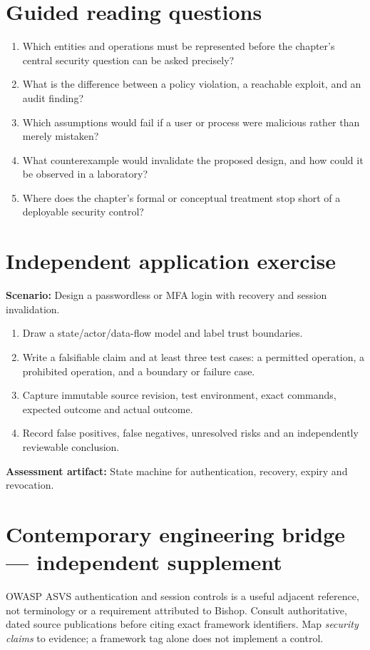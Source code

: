 \documentclass[10pt,letterpaper]{article}
\begin{document}
\section{Guided reading questions}
\begin{enumerate}
\item Which entities and operations must be represented before the chapter's central security question can be asked precisely?
\item What is the difference between a policy violation, a reachable exploit, and an audit finding?
\item Which assumptions would fail if a user or process were malicious rather than merely mistaken?
\item What counterexample would invalidate the proposed design, and how could it be observed in a laboratory?
\item Where does the chapter's formal or conceptual treatment stop short of a deployable security control?
\end{enumerate}
\section{Independent application exercise}
\textbf{Scenario:} Design a passwordless or MFA login with recovery and session invalidation.
\begin{enumerate}
\item Draw a state/actor/data-flow model and label trust boundaries.
\item Write a falsifiable claim and at least three test cases: a permitted operation, a prohibited operation, and a boundary or failure case.
\item Capture immutable source revision, test environment, exact commands, expected outcome and actual outcome.
\item Record false positives, false negatives, unresolved risks and an independently reviewable conclusion.
\end{enumerate}
\textbf{Assessment artifact:} State machine for authentication, recovery, expiry and revocation.
\section{Contemporary engineering bridge --- independent supplement}
OWASP ASVS authentication and session controls is a useful adjacent reference, not terminology or a requirement attributed to Bishop. Consult authoritative, dated source publications before citing exact framework identifiers. Map \emph{security claims} to evidence; a framework tag alone does not implement a control.
\end{document}
